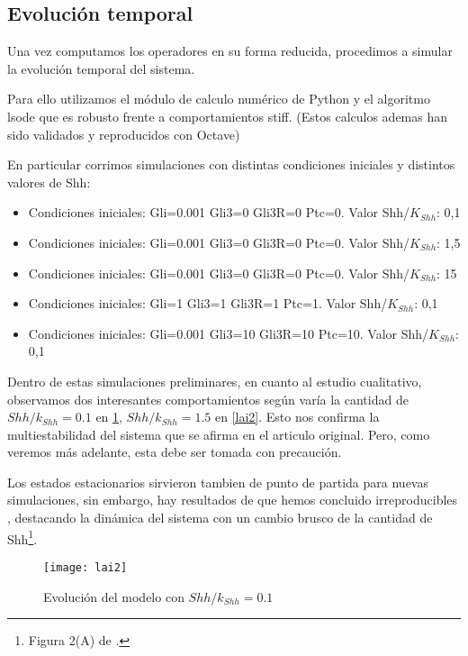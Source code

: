 \subsection{Evolución temporal}
Una vez computamos los operadores en su forma reducida, procedimos a simular la evolución temporal del sistema. 

Para ello utilizamos el módulo de calculo numérico de Python y el algoritmo lsode que es robusto frente a comportamientos stiff. (Estos calculos ademas han sido validados y reproducidos con Octave)

En particular corrimos simulaciones con distintas condiciones iniciales y distintos valores de Shh:

\begin{itemize}
	\item Condiciones iniciales: Gli=0.001 Gli3=0 Gli3R=0 Ptc=0.  Valor Shh/$K_{Shh}$: 0,1
	\item Condiciones iniciales: Gli=0.001 Gli3=0 Gli3R=0 Ptc=0.  Valor Shh/$K_{Shh}$: 1,5
	\item Condiciones iniciales: Gli=0.001 Gli3=0 Gli3R=0 Ptc=0.  Valor Shh/$K_{Shh}$: 15
	\item Condiciones iniciales: Gli=1 Gli3=1 Gli3R=1 Ptc=1.  Valor Shh/$K_{Shh}$: 0,1
	\item Condiciones iniciales: Gli=0.001 Gli3=10 Gli3R=10 Ptc=10.  Valor Shh/$K_{Shh}$: 0,1
\end{itemize}

Dentro de estas simulaciones preliminares, en cuanto al estudio cualitativo, observamos dos interesantes comportamientos según varía la cantidad de $Shh/k_{Shh}=0.1$ en \ref{lai1}, $Shh/k_{Shh}=1.5$ en \ref{lai2}. Esto nos confirma la multiestabilidad del sistema que se afirma en el articulo original. Pero, como veremos más adelante, esta debe ser tomada con precaución.

Los estados estacionarios sirvieron tambien de punto de partida para nuevas simulaciones, sin embargo, hay resultados de \cite{schaffer} que hemos concluido irreproducibles , destacando la dinámica del sistema con un cambio brusco de la cantidad de Shh\footnote{Figura 2(A) de \cite{schaffer}.}. 



 \begin{figure}[h]
 	\texttt{[image: lai2]}
 	\centering
 	\caption{Evolución del modelo \cite{schaffer} con $Shh/k_{Shh}=0.1$ }
 	\label{lai1}
 \end{figure}


